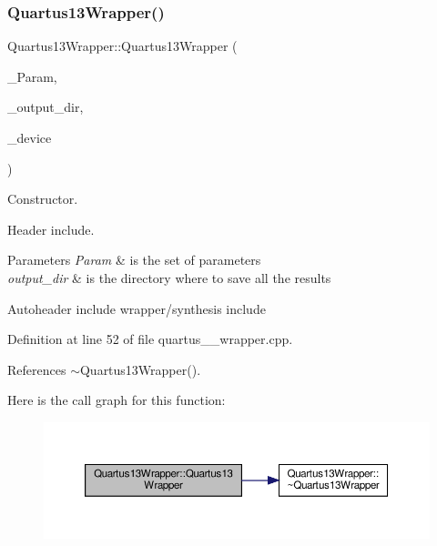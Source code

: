 \subsubsection{\texorpdfstring{Quartus13\+Wrapper()}{Quartus13Wrapper()}}
{\footnotesize\ttfamily Quartus13\+Wrapper\+::\+Quartus13\+Wrapper (\begin{DoxyParamCaption}\item[{const \hyperlink{Parameter_8hpp_a37841774a6fcb479b597fdf8955eb4ea}{Parameter\+Const\+Ref} \&}]{\+\_\+\+Param,  }\item[{const std\+::string \&}]{\+\_\+output\+\_\+dir,  }\item[{const \hyperlink{target__device_8hpp_acedb2b7a617e27e6354a8049fee44eda}{target\+\_\+device\+Ref} \&}]{\+\_\+device }\end{DoxyParamCaption})}



Constructor. 

Header include.


\begin{DoxyParams}{Parameters}
{\em Param} & is the set of parameters \\
\hline
{\em output\+\_\+dir} & is the directory where to save all the results\\
\hline
\end{DoxyParams}
Autoheader include wrapper/synthesis include 

Definition at line 52 of file quartus\+\_\+\_\+wrapper.\+cpp.



References $\sim$\+Quartus13\+Wrapper().

Here is the call graph for this function\+:
\nopagebreak
\begin{figure}[H]
\begin{center}
\leavevmode
\includegraphics[width=350pt]{dc/d06/classQuartus13Wrapper_a49840070270684a80499f67fa67c05b7_cgraph}
\end{center}
\end{figure}
\mbox{\label{classQuartus13Wrapper_ac564cc57b02762aae682a61162c8e525}} 

